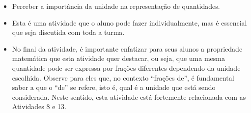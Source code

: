 \begin{atividade}\label{chap2-ativ19}
\objetivos
\begin{itemize} %
    \item       Perceber a importância da unidade na representação de quantidades.
\end{itemize} %

\discussoes
\begin{itemize} %
    \item       Esta é uma atividade que o aluno pode fazer individualmente, mas é essencial que seja discutida com toda a turma.
    \item       No final da atividade, é importante enfatizar para seus alunos a propriedade matemática que esta atividade quer destacar, ou seja, que uma mesma quantidade pode ser expressa por frações diferentes dependendo da unidade escolhida. Observe para eles que, no contexto       ``frações de'', é fundamental saber a que o       ``de''     se refere, isto é, qual é a unidade que está sendo considerada. Neste sentido, esta atividade está fortemente relacionada com as Atividades 8 e 13.
\end{itemize} %


\end{atividade}
